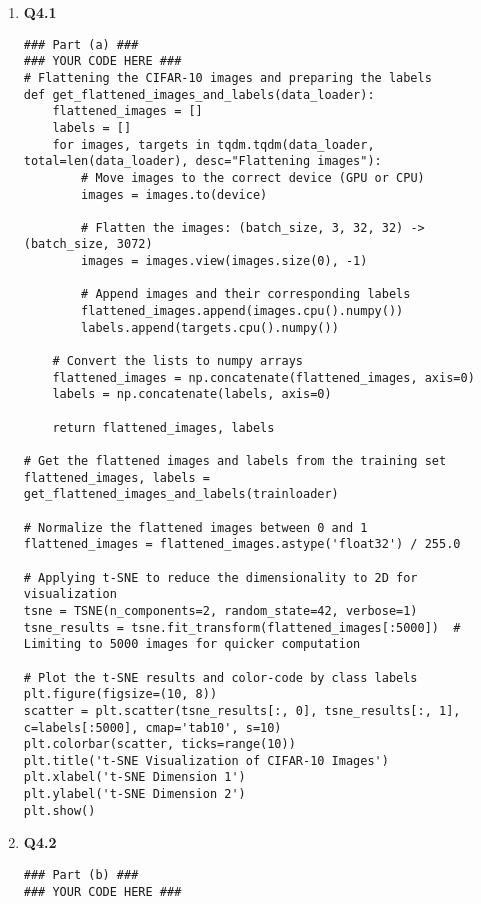 \documentclass{article}
\begin{document}
\begin{enumerate}
    \item 
    \textbf{Q4.1}
    \begin{verbatim}
### Part (a) ###
### YOUR CODE HERE ###
# Flattening the CIFAR-10 images and preparing the labels
def get_flattened_images_and_labels(data_loader):
    flattened_images = []
    labels = []
    for images, targets in tqdm.tqdm(data_loader, total=len(data_loader), desc="Flattening images"):
        # Move images to the correct device (GPU or CPU)
        images = images.to(device)

        # Flatten the images: (batch_size, 3, 32, 32) -> (batch_size, 3072)
        images = images.view(images.size(0), -1)

        # Append images and their corresponding labels
        flattened_images.append(images.cpu().numpy())
        labels.append(targets.cpu().numpy())

    # Convert the lists to numpy arrays
    flattened_images = np.concatenate(flattened_images, axis=0)
    labels = np.concatenate(labels, axis=0)

    return flattened_images, labels

# Get the flattened images and labels from the training set
flattened_images, labels = get_flattened_images_and_labels(trainloader)

# Normalize the flattened images between 0 and 1
flattened_images = flattened_images.astype('float32') / 255.0

# Applying t-SNE to reduce the dimensionality to 2D for visualization
tsne = TSNE(n_components=2, random_state=42, verbose=1)
tsne_results = tsne.fit_transform(flattened_images[:5000])  # Limiting to 5000 images for quicker computation

# Plot the t-SNE results and color-code by class labels
plt.figure(figsize=(10, 8))
scatter = plt.scatter(tsne_results[:, 0], tsne_results[:, 1], c=labels[:5000], cmap='tab10', s=10)
plt.colorbar(scatter, ticks=range(10))
plt.title('t-SNE Visualization of CIFAR-10 Images')
plt.xlabel('t-SNE Dimension 1')
plt.ylabel('t-SNE Dimension 2')
plt.show()

    \end{verbatim}\newpage
    
    
    
    \item 
    \textbf{Q4.2}
    \begin{verbatim}
### Part (b) ###
### YOUR CODE HERE ###


\end{verbatim}
\end{enumerate}
\end{document}
